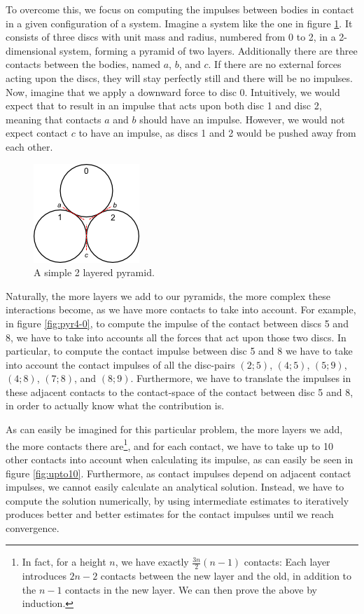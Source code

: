 \documentclass[runningheads,a4paper]{llncs}
\begin{document}

To overcome this, we focus on computing the impulses between bodies in contact
in a given configuration of a system. Imagine a system like the one in figure
\ref{fig:pyr2simple}. It consists of three discs with unit mass and radius,
numbered from 0 to 2, in a 2-dimensional system, forming a pyramid of two
layers. Additionally there are three contacts between the bodies, named $a$,
$b$, and $c$. If there are no external forces acting upon the discs, they will
stay perfectly still and there will be no impulses. Now, imagine that we apply
a downward force to disc 0. Intuitively, we would expect that to result in an
impulse that acts upon both disc 1 and disc 2, meaning that contacts $a$ and
$b$ should have an impulse. However, we would not expect contact $c$ to have an
impulse, as discs 1 and 2 would be pushed away from each other.

\begin{figure}
  \centering
  \includegraphics{figures/pyr2simple.png}
  \caption{A simple 2 layered pyramid.}
  \label{fig:pyr2simple}
\end{figure}

Naturally, the more layers we add to our pyramids, the more complex these
interactions become, as we have more contacts to take into account. For example,
in figure \ref{fig:pyr4-0}, to compute the impulse of the contact between discs
5 and 8, we have to take into accounts all the forces that act upon those two
discs. In particular, to compute the contact impulse between disc 5 and 8 we
have to take into account the contact impulses of all the disc-pairs $(2;5)$,
$(4;5)$, $(5;9)$, $(4;8)$, $(7;8)$, and $(8;9)$. Furthermore, we have to
translate the impulses in these adjacent contacts to the contact-space of the
contact between disc 5 and 8, in order to actually know what the contribution
is.

As can easily be imagined for this particular problem, the more layers we add,
the more contacts there are\footnote{In fact, for a height $n$, we have
  exactly $\frac{3n}{2}(n-1)$ contacts: Each layer introduces $2n-2$ contacts
  between the new layer and the old, in addition to the $n-1$ contacts in the
  new layer. We can then prove the above by induction.}, and for each contact,
we have to take up to 10 other contacts into account when calculating its
impulse, as can easily be seen in figure \ref{fig:upto10}. Furthermore, as
contact impulses depend on adjacent contact impulses, we cannot easily
calculate an analytical solution. Instead, we have to compute the solution
numerically, by using intermediate estimates to iteratively produces better and
better estimates for the contact impulses until we reach convergence.
\end{document}
